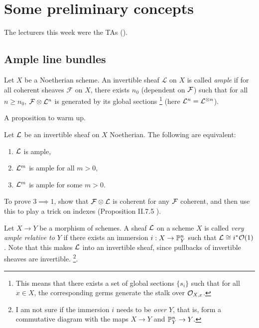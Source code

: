 \chapter{Some preliminary concepts}
The lecturers this week were the TAs ().
\section{Ample line bundles}

\begin{definition}
	Let $X$ be a Noetherian scheme. An invertible sheaf $\mathcal{L}$ on $X$ is called \emph{ample} if for all coherent sheaves $\mathcal{F}$ on $X$, there exists $n_0$ (dependent on $\mathcal{F}$) such that for all $n \geq n_0$, $\mathcal{F} \otimes \mathcal{L}^n$ is generated by its global sections \footnote{This means that there exists a set of global sections $\{s_i\}$ such that for all $x \in X$, the corresponding germs generate the stalk over $\mathcal{O}_{X,x}$.} (here $\mathcal{L}^n = \mathcal{L}^{\otimes n}$).
\end{definition}

A proposition to warm up.
\begin{proposition} Let $\mathcal{L}$ be an invertible sheaf on $X$ Noetherian.
	The following are equivalent: \begin{enumerate}
    	\item $\mathcal{L}$ is ample,
		\item $\mathcal{L}^m$ is ample for all $m > 0$,
		\item $\mathcal{L}^m$ is ample for some $m > 0$.
    \end{enumerate}
\end{proposition}

To prove $3 \implies 1$, show that $\mathcal{F} \otimes \mathcal{L}$ is coherent for any $\mathcal{F}$ coherent, and then use this to play a trick on indexes (Proposition II.7.5 \cite{hartshorne2013algebraic}).

\begin{definition}\label{def:very-ample}
	Let $X \to Y$ be a morphism of schemes. A sheaf $\mathcal{L}$ on a scheme $X$ is called \emph{very ample relative to $Y$} if there exists an immersion $i: X \to \mathbb{P}^n_Y$ such that $\mathcal{L} \cong i^* \mathcal{O}(1)$. Note that this makes $\mathcal{L}$ into an invertible sheaf, since pullbacks of invertible sheaves are invertible. \footnote{I am not sure if the immersion $i$ needs to be \emph{over $Y$}, that is, form a commutative diagram with the maps $X \to Y$ and $\mathbb{P}^n_Y \to Y$.}. 
\end{definition}

